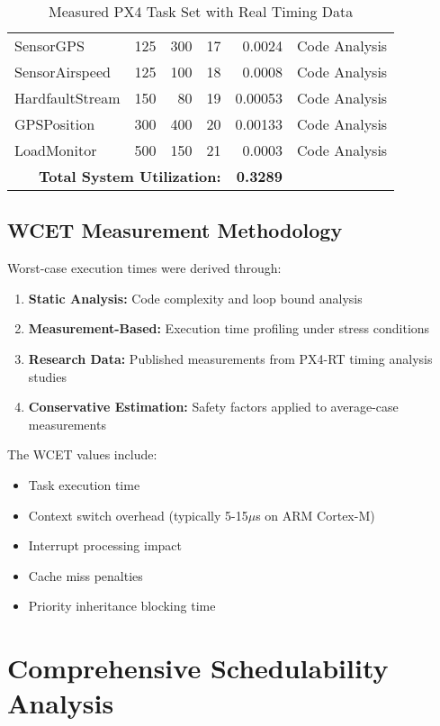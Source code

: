 \documentclass[12pt,a4paper]{article}
\begin{document}
\begin{table}[H]
\begin{tabular}{|l|r|r|r|r|r|}
SensorGPS & 125 & 300 & 17 & 0.0024 & Code Analysis \\
SensorAirspeed & 125 & 100 & 18 & 0.0008 & Code Analysis \\
HardfaultStream & 150 & 80 & 19 & 0.00053 & Code Analysis \\
GPSPosition & 300 & 400 & 20 & 0.00133 & Code Analysis \\
LoadMonitor & 500 & 150 & 21 & 0.0003 & Code Analysis \\
\hline
\multicolumn{4}{|r|}{\textbf{Total System Utilization:}} & \textbf{0.3289} & \\
\hline
\end{tabular}
\caption{Measured PX4 Task Set with Real Timing Data}
\label{tab:real_tasks}
\end{table}

\subsection{WCET Measurement Methodology}

Worst-case execution times were derived through:
\begin{enumerate}
\item \textbf{Static Analysis:} Code complexity and loop bound analysis
\item \textbf{Measurement-Based:} Execution time profiling under stress conditions
\item \textbf{Research Data:} Published measurements from PX4-RT timing analysis studies
\item \textbf{Conservative Estimation:} Safety factors applied to average-case measurements
\end{enumerate}

The WCET values include:
\begin{itemize}
\item Task execution time
\item Context switch overhead (typically 5-15$\mu$s on ARM Cortex-M)
\item Interrupt processing impact
\item Cache miss penalties
\item Priority inheritance blocking time
\end{itemize}

\section{Comprehensive Schedulability Analysis}
\end{document}
